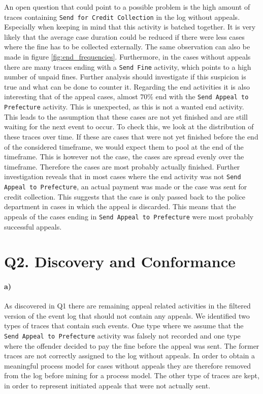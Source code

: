 \documentclass[12pt]{report}
\begin{document}
An open question that could point to a possible problem is the high amount of traces containing \texttt{Send for Credit Collection} in the log without appeals. Especially when keeping in mind that this activity is batched together. It is very likely that the average case duration could be reduced if there were less cases where the fine has to be collected externally. The same observation can also be made in figure \ref{fig:end_frequencies}. Furthermore, in the cases without appeals there are many traces ending with a \texttt{Send Fine} activity, which points to a high number of unpaid fines. Further analysis should investigate if this suspicion is true and what can be done to counter it. Regarding the end activities it is also interesting that of the appeal cases, almost $70\%$ end with the \texttt{Send Appeal to Prefecture} activity. This is unexpected, as this is not a wanted end activity. This leads to the assumption that these cases are not yet finished and are still waiting for the next event to occur. To check this, we look at the distribution of these traces over time. If these are cases that were not yet finished before the end of the considered timeframe, we would expect them to pool at the end of the timeframe. This is however not the case, the cases are spread evenly over the timeframe. Therefore the cases are most probably actually finished. Further investigation reveals that in most cases where the end activity was not \texttt{Send Appeal to Prefecture}, an actual payment was made or the case was sent for credit collection. This suggests that the case is only passed back to the police department in cases in which the appeal is discarded. This means that the appeals of the cases ending in \texttt{Send Appeal to Prefecture} were most probably successful appeals.

\section{Q2. Discovery and Conformance}

\paragraph{\textbf{a)}}
As discovered in Q1 there are remaining appeal related activities in the filtered version of the event log that should not contain any appeals. We identified two types of traces that contain such events. One type where we assume that the \texttt{Send Appeal to Prefecture} activity was falsely not recorded and one type where the offender decided to pay the fine before the appeal was sent. The former traces are not correctly assigned to the log without appeals. In order to obtain a meaningful process model for cases without appeals they are therefore removed from the log before mining for a process model. The other type of traces are kept, in order to represent initiated appeals that were not actually sent.
\end{document}
